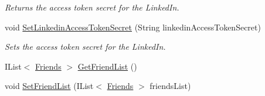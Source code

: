 \begin{DoxyCompactItemize}
\begin{DoxyCompactList}\small\item\em Returns the access token secret for the Linked\+In. \end{DoxyCompactList}\item 
void \hyperlink{classcom_1_1shephertz_1_1app42_1_1paas_1_1sdk_1_1windows_1_1social_1_1_social_a11fcea62c3771a25002e77f09ef374ce}{Set\+Linkedin\+Access\+Token\+Secret} (String linkedin\+Access\+Token\+Secret)
\begin{DoxyCompactList}\small\item\em Sets the access token secret for the Linked\+In. \end{DoxyCompactList}\item 
I\+List$<$ \hyperlink{classcom_1_1shephertz_1_1app42_1_1paas_1_1sdk_1_1windows_1_1social_1_1_social_1_1_friends}{Friends} $>$ \hyperlink{classcom_1_1shephertz_1_1app42_1_1paas_1_1sdk_1_1windows_1_1social_1_1_social_a5c9e7863ca2fdb6ac39651ce54892c2e}{Get\+Friend\+List} ()
\item 
void \hyperlink{classcom_1_1shephertz_1_1app42_1_1paas_1_1sdk_1_1windows_1_1social_1_1_social_ae81202a0bb15df23f94d4f8bd765185b}{Set\+Friend\+List} (I\+List$<$ \hyperlink{classcom_1_1shephertz_1_1app42_1_1paas_1_1sdk_1_1windows_1_1social_1_1_social_1_1_friends}{Friends} $>$ friends\+List)
\end{DoxyCompactItemize}
